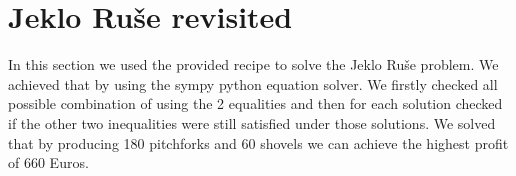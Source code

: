 \documentclass[9pt]{IEEEtran}
\begin{document}
\section{Jeklo Ruše revisited}
In this section we used the provided recipe to solve the Jeklo Ruše problem. We achieved that 
by using the sympy python equation solver. We firstly checked all possible combination of 
using the 2 equalities and then for each solution checked if the other two inequalities 
were still satisfied under those solutions. We solved that by producing 180 pitchforks and 
60 shovels we can achieve the highest profit of 660 Euros. 
\end{document}
